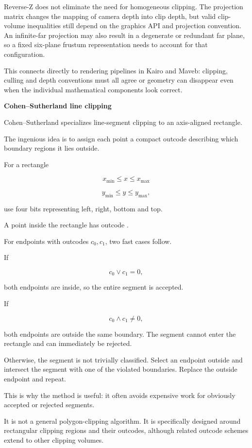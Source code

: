 Reverse-Z does not eliminate the need for homogeneous clipping. The projection matrix changes the mapping of camera depth into clip depth, but valid clip-volume inequalities still depend on the graphics API and projection convention. An infinite-far projection may also result in a degenerate or redundant far plane, so a fixed six-plane frustum representation needs to account for that configuration.

This connects directly to rendering pipelines in Kairo and Maveb: clipping, culling and depth conventions must all agree or geometry can disappear even when the individual mathematical components look correct.

\textbf{Cohen--Sutherland line clipping}

Cohen--Sutherland specializes line-segment clipping to an axis-aligned rectangle.

The ingenious idea is to assign each point a compact outcode describing which boundary regions it lies outside.

For a rectangle

\[
x_{\min}\le x\le x_{\max}
\]

\[
y_{\min}\le y\le y_{\max},
\]

use four bits representing left, right, bottom and top.

A point inside the rectangle has outcode .

For endpoints with outcodes \(c_0,c_1\), two fast cases follow.

If

\[
c_0\lor c_1=0,
\]

both endpoints are inside, so the entire segment is accepted.

If

\[
c_0\land c_1\ne0,
\]

both endpoints are outside the same boundary. The segment cannot enter the rectangle and can immediately be rejected.

Otherwise, the segment is not trivially classified. Select an endpoint outside and intersect the segment with one of the violated boundaries. Replace the outside endpoint and repeat.

This is why the method is useful: it often avoids expensive work for obviously accepted or rejected segments.

It is not a general polygon-clipping algorithm. It is specifically designed around rectangular clipping regions and their outcodes, although related outcode schemes extend to other clipping volumes.

